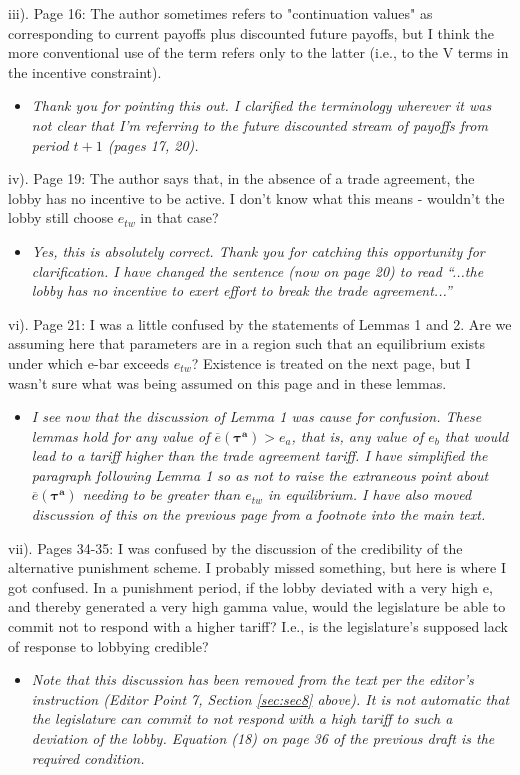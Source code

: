 \documentclass[12pt]{article}
\newcommand{\ov}{\overline}
\newcommand{\bta}{\bm{\tau^a}}
\begin{document}
iii). Page 16: The author sometimes refers to "continuation values" as corresponding to current payoffs plus discounted future payoffs, but I think the more conventional use of the term refers only to the latter (i.e., to the V terms in the incentive constraint).
\begin{itemize}
\renewcommand\labelitemi{-}
	\item \textit{Thank you for pointing this out. I clarified the terminology wherever it was not clear that I'm referring to the future discounted stream of payoffs from period $t+1$ (pages 17, 20).}
\end{itemize}

iv). Page 19: The author says that, in the absence of a trade agreement, the lobby has no incentive to be active. I don't know what this means - wouldn't the lobby still choose $e_{tw}$ in that case?
\begin{itemize}
\renewcommand\labelitemi{-}
	\item \textit{Yes, this is absolutely correct. Thank you for catching this opportunity for clarification. I have changed the sentence (now on page 20) to read ``...the lobby has no incentive to exert effort to break the trade agreement...''}
\end{itemize}

vi). Page 21: I was a little confused by the statements of Lemmas 1 and 2. Are we assuming here that parameters are in a region such that an equilibrium exists under which e-bar exceeds $e_{tw}$? Existence is treated on the next page, but I wasn't sure what was being assumed on this page and in these lemmas.
\begin{itemize}
\renewcommand\labelitemi{-}
	\item \textit{I see now that the discussion of Lemma 1 was cause for confusion. These lemmas hold for any value of $\ov{e}(\bta)>e_a$, that is, any value of $e_b$ that would lead to a tariff higher than the trade agreement tariff. I have simplified the paragraph following Lemma 1 so as not to raise the extraneous point about $\ov{e}(\bta)$ needing to be greater than $e_{tw}$ in equilibrium. I have also moved discussion of this on the previous page from a footnote into the main text.}
\end{itemize}


vii). Pages 34-35: I was confused by the discussion of the credibility of the alternative punishment scheme. I probably missed something, but here is where I got confused. In a punishment period, if the lobby deviated with a very high e, and thereby generated a very high gamma value, would the legislature be able to commit not to respond with a higher tariff? I.e., is the legislature's supposed lack of response to lobbying credible?
\begin{itemize}
\renewcommand\labelitemi{-}
	\item \textit{Note that this discussion has been removed from the text per the editor's instruction (Editor Point 7, Section \ref{sec:sec8} above). It is not automatic that the legislature can commit to not respond with a high tariff to such a deviation of the lobby. Equation (18) on page 36 of the previous draft is the required condition.}
\end{itemize}
\end{document}
